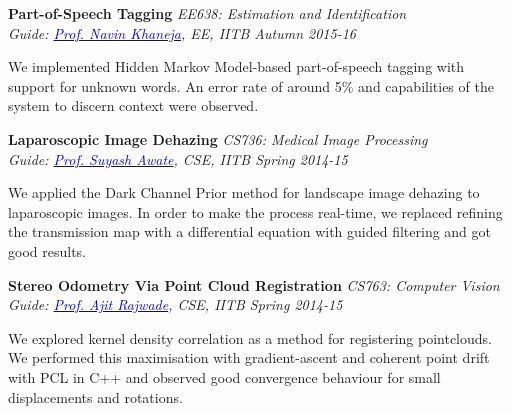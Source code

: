 \documentclass[margin,line]{res}
\newenvironment{list1}{
  \begin{list}{\ding{113}}{%
      \setlength{\itemsep}{0in}
      \setlength{\parsep}{0in} \setlength{\parskip}{0in}
      \setlength{\topsep}{0in} \setlength{\partopsep}{0in} 
      \setlength{\leftmargin}{0.17in}}}{\end{list}}
\begin{document}
\begin{resume}
\vspace*{-0.1in}

{\bf Part-of-Speech Tagging} \hfill \textit{EE638: Estimation and Identification} \\
{\em Guide: \href{https://www.ee.iitb.ac.in/course/~ee638/Navin}{\textcolor{blue}{Prof. Navin Khaneja}}, EE, IITB \hfill Autumn 2015-16} \\
\vspace*{-.15in}
\begin{list1}
\item[] We implemented Hidden Markov Model-based part-of-speech tagging with support for unknown words. An error rate of around 5\% and capabilities of the system to discern context were observed.
\end{list1}

\vspace*{-0.1in}

{\bf Laparoscopic Image Dehazing} \hfill \textit{CS736: Medical Image Processing} \\
{\em Guide: \href{https://www.cse.iitb.ac.in/~suyash}{\textcolor{blue}{Prof. Suyash Awate}}, CSE, IITB \hfill Spring 2014-15} \\
\vspace*{-.15in}
\begin{list1}
\item[] We applied the Dark Channel Prior method for landscape image dehazing to laparoscopic images. In order to make the process real-time, we replaced refining the transmission map with a differential equation with guided filtering and got good results.
\end{list1}

\vspace*{-0.1in}

{\bf Stereo Odometry Via Point Cloud Registration} \hfill \textit{CS763: Computer Vision} \\
{\em Guide: \href{https://www.cse.iitb.ac.in/~ajitvr}{\textcolor{blue}{Prof. Ajit Rajwade}}, CSE, IITB \hfill Spring 2014-15} \\
\vspace*{-.15in}
\begin{list1}
\item[] We explored kernel density correlation as a method for registering pointclouds. We performed this maximisation with gradient-ascent and coherent point drift with PCL in C++ and observed good convergence behaviour for small displacements and rotations.
\end{list1}


\end{resume}
\end{document}
